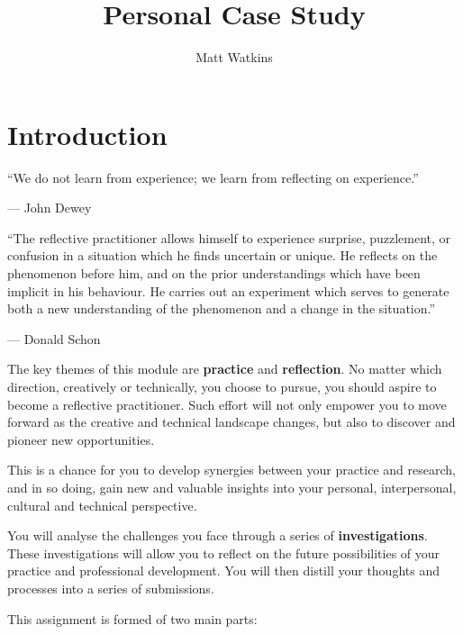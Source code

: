 \documentclass{../../fal_assignment}
\title{Personal Case Study}
\author{Matt Watkins}
\begin{document}
\maketitle

\section*{Introduction}

\begin{marginquote}
“We do not learn from experience; we learn from reflecting on experience.”

— John Dewey

“The reflective practitioner allows himself to experience surprise, puzzlement, or confusion in a situation which he finds uncertain or unique. He reflects on the phenomenon before him, and on the prior understandings which have been implicit in his behaviour. He carries out an experiment which serves to generate both a new understanding of the phenomenon and a change in the situation.”

— Donald Schon
\end{marginquote}

The key themes of this module are \textbf{practice} and \textbf{reflection}. No matter which direction, creatively or technically, you choose to pursue, you should aspire to become a reflective practitioner. Such effort will not only empower you to move forward as the creative and technical landscape changes, but also to discover and pioneer new opportunities.

This is a chance for you to develop synergies between your practice and research, and in so doing, gain new and valuable insights into your personal, interpersonal, cultural and technical perspective.

You will analyse the challenges you face through a series of \textbf{investigations}. These investigations will allow you to reflect on the future possibilities of your practice and professional development. You will then distill your thoughts and processes into a series of submissions.

This assignment is formed of two main parts:
\end{document}
